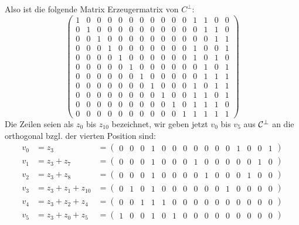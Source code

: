 \begin{myList}
Also ist die folgende Matrix Erzeugermatrix von $C^\bot$:
\begin{equation*}
	\begin{pmatrix}
	1 & 0 & 0 & 0 & 0 & 0 & 0 & 0 & 0 & 0 & 0 &		1 & 1 & 0 & 0 \\
	0 & 1 & 0 & 0 & 0 & 0 & 0 & 0 & 0 & 0 & 0 &		0 & 1 & 1 & 0 \\
	0 & 0 & 1 & 0 & 0 & 0 & 0 & 0 & 0 & 0 & 0 &		0 & 0 & 1 & 1 \\
	0 & 0 & 0 & 1 & 0 & 0 & 0 & 0 & 0 & 0 & 0 &		1 & 0 & 0 & 1 \\
	0 & 0 & 0 & 0 & 1 & 0 & 0 & 0 & 0 & 0 & 0 &		1 & 0 & 1 & 0 \\
	0 & 0 & 0 & 0 & 0 & 1 & 0 & 0 & 0 & 0 & 0 &		0 & 1 & 0 & 1 \\
	0 & 0 & 0 & 0 & 0 & 0 & 1 & 0 & 0 & 0 & 0 &		0 & 1 & 1 & 1 \\
	0 & 0 & 0 & 0 & 0 & 0 & 0 & 1 & 0 & 0 & 0 &		1 & 0 & 1 & 1 \\
	0 & 0 & 0 & 0 & 0 & 0 & 0 & 0 & 1 & 0 & 0 &		1 & 1 & 0 & 1 \\
	0 & 0 & 0 & 0 & 0 & 0 & 0 & 0 & 0 & 1 & 0 &		1 & 1 & 1 & 0 \\
	0 & 0 & 0 & 0 & 0 & 0 & 0 & 0 & 0 & 0 & 1 &		1 & 1 & 1 & 1 
	\end{pmatrix}
\end{equation*}
Die Zeilen seien als $z_0$ bis $z_{10}$ bezeichnet, wir geben jetzt $v_0$ bis $v_5$ aus $\mathcal{C}^\bot$ an die orthogonal bzgl. der vierten Position sind:\\
\begin{align*}
	v_0 &= z_3 &= \begin{pmatrix}
		0 & 0 & 0 & 1 & 0 & 0 & 0 & 0 & 0 & 0 & 0 &		1 & 0 & 0 & 1
		\end{pmatrix} \\
	v_1 &= z_3 + z_7 &= \begin{pmatrix}
		0 & 0 & 0 & 1 & 0 & 0 & 0 & 1 & 0 & 0 & 0 &		0 & 0 & 1 & 0
		\end{pmatrix}\\
	v_2 &= z_3 + z_8 &= \begin{pmatrix}
		0 & 0 & 0 & 1 & 0 & 0 & 0 & 0 & 1 & 0 & 0 &		0 & 1 & 0 & 0
		\end{pmatrix}\\
	v_3 &= z_3 + z_1 + z_{10} &= \begin{pmatrix}
		0 & 1 & 0 & 1 & 0 & 0 & 0 & 0 & 0 & 0 & 1 &		0 & 0 & 0 & 0
		\end{pmatrix}\\
	v_4 &= z_3 + z_2 + z_4 &= \begin{pmatrix}
		0 & 0 & 1 & 1 & 1 & 0 & 0 & 0 & 0 & 0 & 0 &		0 & 0 & 0 & 0
		\end{pmatrix}\\
	v_5 &= z_3 + z_0 + z_5 &= \begin{pmatrix}
		1 & 0 & 0 & 1 & 0 & 1 & 0 & 0 & 0 & 0 & 0 &		0 & 0 & 0 & 0
		\end{pmatrix}
\end{align*}


\end{myList}
